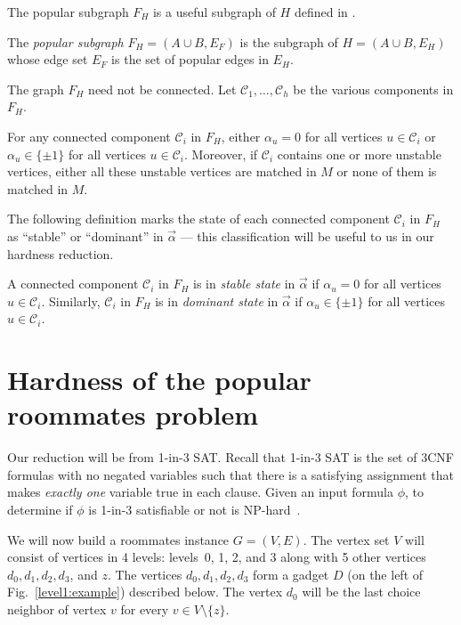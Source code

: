 \documentclass{llncs}
\newcommand{\Comp}{\mathcal{C}}
\begin{document}
The popular  subgraph $F_H$ is a useful subgraph of $H$ defined in \cite{Kav18}.

\begin{definition}
\label{def:popular-subgraph}
  The {\em popular subgraph} $F_H = (A \cup B, E_F)$ is the subgraph of $H = (A \cup B, E_H)$
whose edge set $E_F$ is the set of popular edges in $E_H$.
\end{definition}



The graph $F_H$ need not be connected. Let $\Comp_1,\ldots,\Comp_h$ be the various components in $F_H$. 


\begin{lemma}
\label{prop1}
For any connected component $\Comp_i$ in $F_H$, either $\alpha_u = 0$ for all vertices $u \in \Comp_i$ or 
$\alpha_u \in \{\pm 1\}$ for all vertices $u \in \Comp_i$. Moreover, if $\Comp_i$ contains one or 
more unstable vertices, either all these unstable vertices are matched in $M$ or none of them is 
matched in $M$.
\end{lemma}

The following definition marks the state of each connected component  $\Comp_i$ in $F_H$ as ``stable'' or ``dominant'' in $\vec{\alpha}$
--- this classification will be useful to us in our hardness reduction.

\begin{definition}
  \label{def:stab-domn}
A connected component $\Comp_i$ in $F_H$ is in {\em stable state} in $\vec{\alpha}$ if  $\alpha_u = 0$ for all vertices $u \in \Comp_i$.
Similarly, $\Comp_i$ in $F_H$ is in {\em dominant state} in $\vec{\alpha}$ if  $\alpha_u \in \{\pm 1\}$ for all vertices $u \in \Comp_i$.
\end{definition}


\section{Hardness of the popular roommates problem}
\label{sec:hardness}

Our reduction will be from 1-in-3 SAT. Recall that 1-in-3 SAT is the set of 3CNF formulas with no negated variables such that there is a
satisfying assignment that makes {\em exactly one} variable true in each clause. Given an input formula $\phi$, to determine if $\phi$ is
1-in-3 satisfiable or not is NP-hard~\cite{Sch78}.

We will now build a roommates instance $G = (V, E)$. The vertex set $V$ will consist of vertices in 4 levels: levels~0, 1, 2, and 3 along with
5 other vertices $d_0,d_1,d_2,d_3$, and $z$. The vertices $d_0,d_1,d_2,d_3$ form a gadget $D$ (on the left of Fig.~\ref{level1:example}) described below.
The vertex $d_0$ will be the last choice neighbor of vertex $v$ for every $v \in V \setminus \{z\}$.
\end{document}
